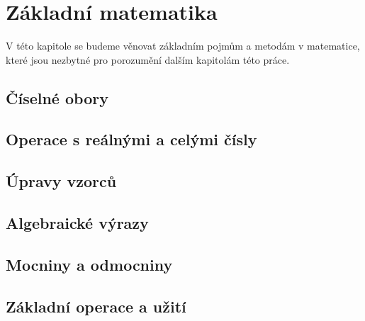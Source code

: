 
\newpage
\chapter{Základní matematika}
V této kapitole se budeme věnovat základním pojmům a metodám v matematice, které jsou nezbytné pro porozumění dalším kapitolám této práce.
    \section{Číselné obory}
    \section{Operace s reálnými a celými čísly}
    \section{Úpravy vzorců}
    \section{Algebraické výrazy}
    \section{Mocniny a odmocniny}
    \section{Základní operace a užití}



